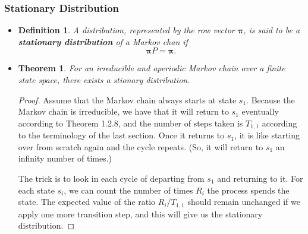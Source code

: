 \documentclass[10pt]{article}
\newtheorem{theorem}[lemma]{Theorem}
\newtheorem{definition}[lemma]{Definition}
\newcommand{\ves}[1]{\boldsymbol{#1}}
\begin{document}
\subsubsection{Stationary Distribution}

\begin{itemize}
  \item \begin{definition}
    A distribution, represented by the row vector $\ves{\pi}$, is said to be a {\bf stationary distribution} of a Markov chan if $$\ves{\pi} P = \ves{\pi}.$$
  \end{definition}

  \item \begin{theorem} \label{theorem:stationary-distribution-existence-finite}
    For an irreducible and aperiodic Markov chain over a finite state space, there exists a stionary distribution.
  \end{theorem}

  \begin{proof}
    Assume that the Markov chain always starts at state $s_1$. Because the Markov chain is irreducible, we have that it will return to $s_1$ eventually according to Theorem 1.2.8, and the number of steps taken is $T_{1,1}$ according to the terminology of the last section. Once it returns to $s_1$, it is like starting over from scratch again and the cycle repeats. (So, it will return to $s_1$ an infinity number of times.)

    The trick is to look in each cycle of departing from $s_1$ and returning to it. For each state $s_i$, we can count the number of times $R_i$ the process spends the state. The expected value of the ratio $R_i/T_{1,1}$ should remain unchanged if we apply one more transition step, and this will give us the stationary distribution.


\end{proof}
\end{itemize}
\end{document}
